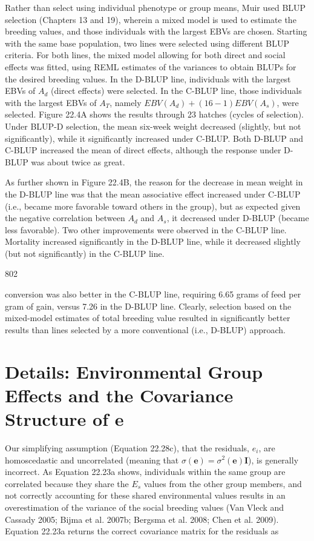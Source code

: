 \documentclass{article}
\begin{document}
Rather than select using individual phenotype or group means, Muir used BLUP selection (Chapters 13 and 19), wherein a mixed model is used to estimate the breeding values, and those individuals with the largest EBVs are chosen. Starting with the same base population, two lines were selected using different BLUP criteria. For both lines, the mixed model allowing for both direct and social effects was fitted, using REML estimates of the variances to obtain BLUPs for the desired breeding values. In the D-BLUP line, individuals with the largest EBVs of  $ A_d $ (direct effects) were selected. In the C-BLUP line, those individuals with the largest EBVs of  $ A_T $, namely  $ EBV(A_d) + (16 - 1)EBV(A_s) $, were selected. Figure 22.4A shows the results through 23 hatches (cycles of selection). Under BLUP-D selection, the mean six-week weight decreased (slightly, but not significantly), while it significantly increased under C-BLUP. Both D-BLUP and C-BLUP increased the mean of direct effects, although the response under D-BLUP was about twice as great.

As further shown in Figure 22.4B, the reason for the decrease in mean weight in the D-BLUP line was that the mean associative effect increased under C-BLUP (i.e., became more favorable toward others in the group), but as expected given the negative correlation between  $ A_d $ and  $ A_s $, it decreased under D-BLUP (became less favorable). Two other improvements were observed in the C-BLUP line. Mortality increased significantly in the D-BLUP line, while it decreased slightly (but not significantly) in the C-BLUP line.

802

conversion was also better in the C-BLUP line, requiring 6.65 grams of feed per gram of gain, versus 7.26 in the D-BLUP line. Clearly, selection based on the mixed-model estimates of total breeding value resulted in significantly better results than lines selected by a more conventional (i.e., D-BLUP) approach.

\section{Details: Environmental Group Effects and the Covariance Structure of e}
Our simplifying assumption (Equation 22.28c), that the residuals,  $ e_i $, are homoscedastic and uncorrelated (meaning that  $ \sigma(\mathbf{e}) = \sigma^2(\mathbf{e})\mathbf{I} $), is generally incorrect. As Equation 22.23a shows, individuals within the same group are correlated because they share the  $ E_s $ values from the other group members, and not correctly accounting for these shared environmental values results in an overestimation of the variance of the social breeding values (Van Vleck and Cassady 2005; Bijma et al. 2007b; Bergsma et al. 2008; Chen et al. 2009). Equation 22.23a returns the correct covariance matrix for the residuals as
\end{document}
